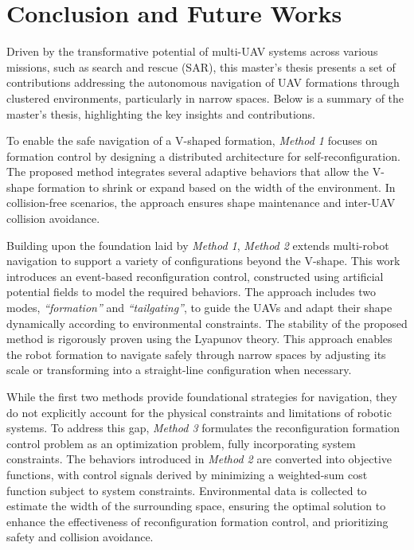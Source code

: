 \chapter{Conclusion and Future Works}\label{conclusion}

Driven by the transformative potential of multi-UAV systems across various missions, such as search and rescue (SAR), this master's thesis presents a set of contributions addressing the autonomous navigation of UAV formations through clustered environments, particularly in narrow spaces. Below is a summary of the master's thesis, highlighting the key insights and contributions.

To enable the safe navigation of a V-shaped formation, \textit{Method 1} focuses on formation control by designing a distributed architecture for self-reconfiguration. The proposed method integrates several adaptive behaviors that allow the V-shape formation to shrink or expand based on the width of the environment. In collision-free scenarios, the approach ensures shape maintenance and inter-UAV collision avoidance.

Building upon the foundation laid by \textit{Method 1}, \textit{Method 2} extends multi-robot navigation to support a variety of configurations beyond the V-shape. This work introduces an event-based reconfiguration control, constructed using artificial potential fields to model the required behaviors. The approach includes two modes, \textit{``formation''} and \textit{``tailgating''}, to guide the UAVs and adapt their shape dynamically according to environmental constraints. The stability of the proposed method is rigorously proven using the Lyapunov theory. This approach enables the robot formation to navigate safely through narrow spaces by adjusting its scale or transforming into a straight-line configuration when necessary.

While the first two methods provide foundational strategies for navigation, they do not explicitly account for the physical constraints and limitations of robotic systems. To address this gap, \textit{Method 3} formulates the reconfiguration formation control problem as an optimization problem, fully incorporating system constraints. The behaviors introduced in \textit{Method 2} are converted into objective functions, with control signals derived by minimizing a weighted-sum cost function subject to system constraints. Environmental data is collected to estimate the width of the surrounding space, ensuring the optimal solution to enhance the effectiveness of reconfiguration formation control, and prioritizing safety and collision avoidance.

